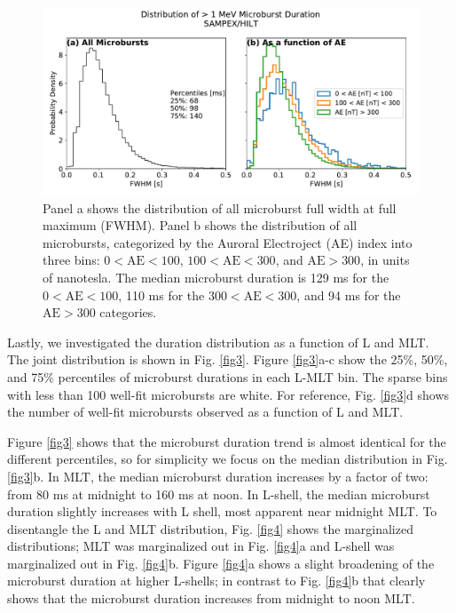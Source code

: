 \documentclass[draft]{agujournal2019}
\begin{document}
\begin{figure}
\noindent\includegraphics[width=\textwidth]{figures/fig2.pdf}
\caption{Panel a shows the distribution of all microburst full width at full maximum (FWHM). Panel b shows the distribution of all microbursts, categorized by the Auroral Electroject (AE) index into three bins: $0 < \mathrm{AE} < 100$, $100 < \mathrm{AE} < 300$, and $\mathrm{AE} > 300$, in units of nanotesla. The median microburst duration is 129 ms for the $0 < \mathrm{AE} < 100$, 110 ms for the $300 < \mathrm{AE} < 300$, and 94 ms for the $ \mathrm{AE} > 300$ categories.}
\label{fig2}
\end{figure}

Lastly, we investigated the duration distribution as a function of L and MLT. The joint distribution is shown in Fig. \ref{fig3}. Figure \ref{fig3}a-c show the 25\%, 50\%, and 75\% percentiles of microburst durations in each L-MLT bin. The sparse bins with less than 100 well-fit microbursts are white. For reference, Fig. \ref{fig3}d shows the number of well-fit microbursts observed as a function of L and MLT.

Figure \ref{fig3} shows that the microburst duration trend is almost identical for the different percentiles, so for simplicity we focus on the median distribution in Fig. \ref{fig3}b. In MLT, the median microburst duration increases by a factor of two: from 80 ms at midnight to 160 ms at noon. In L-shell, the median microburst duration slightly increases with L shell, most apparent near midnight MLT. To disentangle the L and MLT distribution, Fig. \ref{fig4} shows the marginalized distributions; MLT was marginalized out in Fig. \ref{fig4}a and L-shell was marginalized out in Fig. \ref{fig4}b. Figure \ref{fig4}a shows a slight broadening of the microburst duration at higher L-shells; in contrast to Fig. \ref{fig4}b that clearly shows that the microburst duration increases from midnight to noon MLT.
\end{document}
